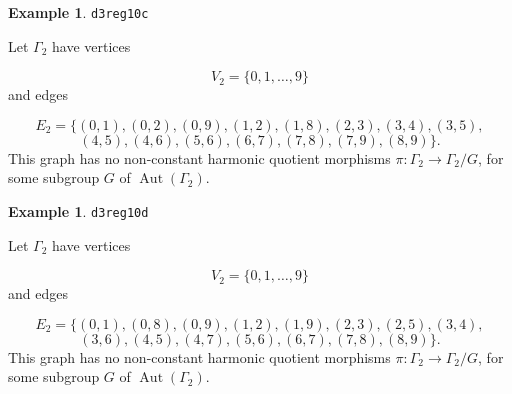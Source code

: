 \documentclass[12pt,letterpaper]{article}
\theoremstyle{definition}
\newtheorem{example}[theorem]{Example}
\DeclareMathOperator{\Aut}{Aut}
\begin{document}
\begin{example}%
\label{example:d3reg10c}
  {\tt d3reg10c}\newline
{\rm  
Let $\Gamma_2$ have vertices

\[
V_2=\{0,1,\dots,9\}
\]
and edges

\[
E_2 = \{
(0, 1), (0, 2), (0, 9), (1, 2), (1, 8), (2, 3), (3, 4), (3, 5),
\]
\[
(4, 5), (4, 6), (5, 6), (6, 7), (7, 8), (7, 9), (8, 9)
\}.
\]
This graph has no non-constant harmonic quotient
morphisms $\pi: \Gamma_2\to \Gamma_2/G$, for some subgroup
$G$ of $\Aut(\Gamma_2)$.

}
\end{example}

\begin{example}%
\label{example:d3reg10d}
  {\tt d3reg10d}\newline
{\rm  
Let $\Gamma_2$ have vertices

\[
V_2=\{0,1,\dots,9\}
\]
and edges

\[
E_2 = \{
(0, 1), (0, 8), (0, 9), (1, 2), (1, 9), (2, 3), (2, 5), (3, 4),
\]
\[
(3, 6), (4, 5), (4, 7), (5, 6), (6, 7), (7, 8), (8, 9)
\}.
\]
This graph has no non-constant harmonic quotient
morphisms $\pi: \Gamma_2\to \Gamma_2/G$, for some subgroup
$G$ of $\Aut(\Gamma_2)$.

}
\end{example}
\end{document}
